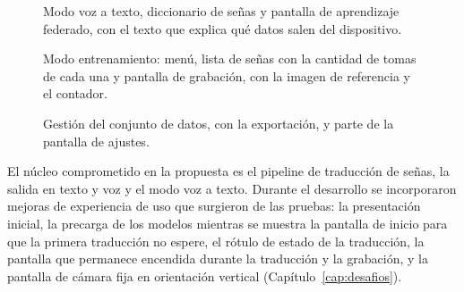 \begin{figure}[p]
    \centering
    \hfill
    \hfill
    \caption{Modo voz a texto, diccionario de señas y pantalla de aprendizaje federado, con el texto que explica qué datos salen del dispositivo.}
    \label{fig:pantallas-voz}
\end{figure}

\begin{figure}[p]
    \centering
    \hfill
    \hfill
    \caption{Modo entrenamiento: menú, lista de señas con la cantidad de tomas de cada una y pantalla de grabación, con la imagen de referencia y el contador.}
    \label{fig:pantallas-entrenamiento}
\end{figure}

\begin{figure}[p]
    \centering
    \hspace{0.04\textwidth}
    \caption{Gestión del conjunto de datos, con la exportación, y parte de la pantalla de ajustes.}
    \label{fig:pantallas-ajustes}
\end{figure}


El núcleo comprometido en la propuesta es el pipeline de traducción de señas, la salida en texto y voz y el modo voz a texto. Durante el desarrollo se incorporaron mejoras de experiencia de uso que surgieron de las pruebas: la presentación inicial, la precarga de los modelos mientras se muestra la pantalla de inicio para que la primera traducción no espere, el rótulo de estado de la traducción, la pantalla que permanece encendida durante la traducción y la grabación, y la pantalla de cámara fija en orientación vertical (Capítulo~\ref{cap:desafios}).

